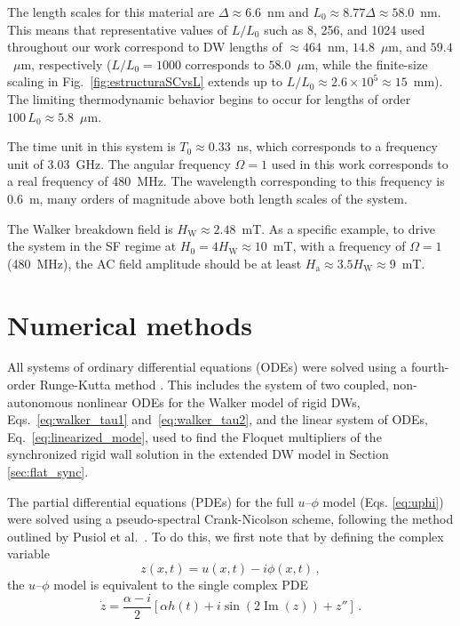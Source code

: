 \documentclass[prb,aps,twocolumn,superscriptaddress,floatfix]{revtex4-1}
\begin{document}
The length scales for this material are $\Delta\approx6.6$~nm and $L_0\approx8.77\Delta\approx58.0$~nm. This means that representative values of $L/L_0$ such as 8, 256, and 1024 used throughout our work correspond to DW lengths of $\approx 464$~nm, $14.8$~$\mu$m, and $59.4$~$\mu$m, respectively ($L/L_0 = 1000$ corresponds to $58.0$~$\mu$m, while the finite-size scaling in Fig.~\ref{fig:estructuraSCvsL} extends up to $L/L_0 \approx 2.6\times 10^5 \approx 15$~mm). The limiting thermodynamic behavior begins to occur for lengths of order $100\, L_0\approx5.8$~$\mu$m.

The time unit in this system is $T_0 \approx0.33$~ns, which corresponds to a frequency unit of $3.03$~GHz. The angular frequency $\Omega=1$ used in this work corresponds to a real frequency of 480~MHz. The wavelength corresponding to this frequency is $0.6$~m, many orders of magnitude above both length scales of the system. 

The Walker breakdown field is $H_\text{W}\approx2.48$~mT. As a specific example, to drive the system in the SF regime at $H_0=4H_\text{W}\approx10$~mT, with a frequency of $\Omega=1$ (480~MHz), the AC field amplitude should be at least $H_\text{a}\approx3.5H_\text{W}\approx9$~mT.

\section{Numerical methods}
\label{ap:num_met}

All systems of ordinary differential equations (ODEs) were solved using a fourth-order Runge-Kutta method \cite{press2007numerical}. This includes the system of two coupled, non-autonomous nonlinear ODEs for the Walker model of rigid DWs, Eqs.~\eqref{eq:walker_tau1} and~\eqref{eq:walker_tau2}, and the linear system of ODEs, Eq.~\eqref{eq:linearized_mode}, used to find the Floquet multipliers of the synchronized rigid wall solution in the extended DW model in Section \ref{sec:flat_sync}.

The partial differential equations (PDEs) for the full $u$--$\phi$ model (Eqs. \eqref{eq:uphi}) were solved using a pseudo-spectral Crank-Nicolson scheme, following the method outlined by Pusiol et al.~\cite{pusiol2026deterministic}. To do this, we first note that by defining the complex variable~\cite{skaugen2022}
\begin{equation}
    z(x,t)=u(x,t)-i\phi(x,t)\, ,
    \label{eq:z_def}
\end{equation}
the $u$--$\phi$ model is equivalent to the single complex PDE
\begin{equation}
    \dot z = \frac{\alpha-i}{2}[\alpha h(t) + i \sin\left(2\operatorname{Im}(z)\right)+z'']\, .
    \label{eq:z_eq}
\end{equation}
\end{document}
